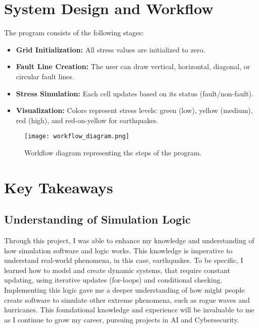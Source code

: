 \documentclass[conference]{IEEEtran}
\begin{document}
\section{System Design and Workflow}
The program consists of the following stages:
\begin{itemize}
    \item \textbf{Grid Initialization:} All stress values are initialized to zero.
    \item \textbf{Fault Line Creation:} The user can draw vertical, horizontal, diagonal, or circular fault lines.
    \item \textbf{Stress Simulation:} Each cell updates based on its status (fault/non-fault).
    \item \textbf{Visualization:} Colors represent stress levels: green (low), yellow (medium), red (high), and red-on-yellow for earthquakes.
\end{itemize}

\begin{figure}[H]
    \centering
    \texttt{[image: workflow\_diagram.png]}
    \caption{Workflow diagram representing the steps of the program.}
    \label{fig:faultlines}
\end{figure}

\section{Key Takeaways}

\subsection{Understanding of Simulation Logic}

Through this project, I was able to enhance my knowledge and understanding of how simulation software and logic works. This knowledge is imperative to understand real-world phenomena, in this case, earthquakes. To be specific, I learned how to model and create dynamic systems, that require constant updating, using iterative updates (for-loops) and conditional checking. Implementing this logic gave me a deeper understanding of how might people create software to simulate other extreme phenomena, such as rogue waves and hurricanes. This foundational knowledge and experience will be invaluable to me as I continue to grow my career, pursuing projects in AI and Cybersecurity. 
\end{document}

